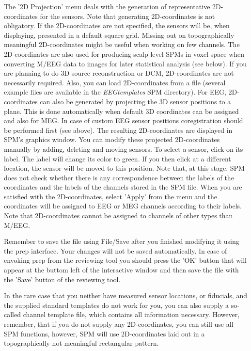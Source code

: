 The '2D Projection' menu deals with the generation of representative
2D-coordinates for the sensors. Note that generating 2D-coordinates is
not obligatory. If the 2D-coordinates are not specified, the sensors will
be, when displaying, presented in a default square grid. Missing out
on topographically meaningful 2D-coordinates might be useful when
working on few channels. The 2D-coordinates are also used for
producing scalp-level SPMs in voxel space when converting M/EEG data
to images for later statistical analysis (see below). If you are 
planning to do 3D source reconstruction or 
DCM, 2D-coordinates are not necessarily required. Also, you can load
2D-coordinates from a file (several example files are available in
the \textit{EEGtemplates} SPM directory). For EEG, 2D-coordinates can also
be generated by projecting the 3D sensor positions to a plane. This is done
automatically when default 3D coordinates can be assigned and also for MEG.
In case of custom EEG sensor positions coregistration should be performed first (see
above). The resulting 2D-coordinates are displayed in SPM's graphics 
window. You can modify these projected 2D-coordinates
manually by adding, deleting and moving sensors. To select a sensor,
click on its label. The label will change its color to green. If
you then click at a different location, the sensor will be
moved to this position. Note that, at this stage, SPM does not
check whether there is any correspondence between the labels of the
coordinates and the labels of the channels stored in the SPM
file. When you are satisfied with the 2D-coordinates, select 'Apply'  
from the menu and the coordinates will be assigned to EEG or MEG
channels according to their labels. Note that 2D-coordinates cannot 
be assigned to channels of other types than M/EEG.  

Remember to save the file using File/Save after you finished modifying
it using the prep interface. Your changes will not be saved
automatically. In case of envoking prep from the reviewing tool you should
press the 'OK' button that will appear at the buttom left of the interactive window and
then save the file with the 'Save' button of the reviewing tool. 

In the rare case that you neither have measured sensor locations,
or fiducials, and the supplied standard templates do not work for you,
you can also supply a so-called channel template file, which contains
all information necessary. However, remember, that if you do not
supply any 2D-coordinates, you can still use all SPM functions,
however, SPM will use 2D-coordinates laid out in a topographically not 
meaningful rectangular pattern.

